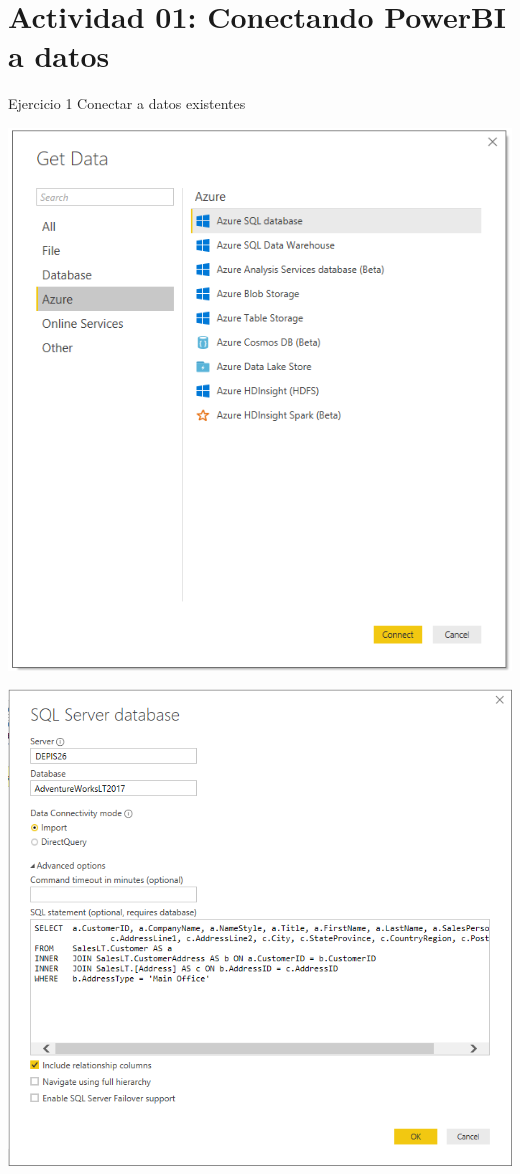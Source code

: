 \section{Actividad 01: Conectando PowerBI a datos} 


Ejercicio 1  Conectar a datos existentes \\
	\begin{center}
	\includegraphics[width=15cm]{./Imagenes/power1}
	\end{center}	

	\begin{center}
	\includegraphics[width=15cm]{./Imagenes/power2}
	\end{center}	

